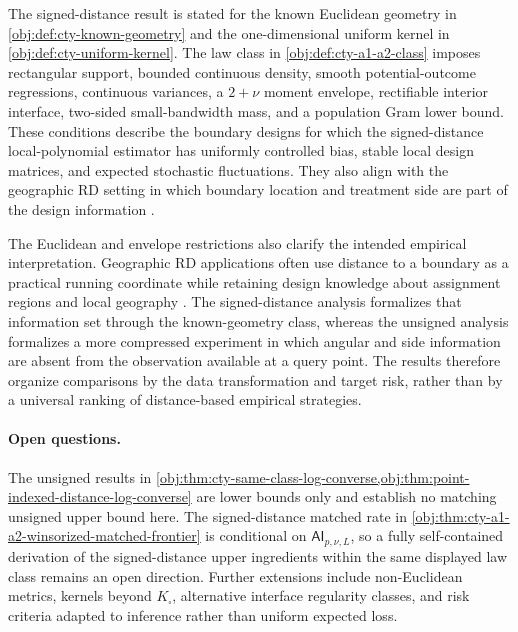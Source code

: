 The signed-distance result is stated for the known Euclidean geometry in \cref{obj:def:cty-known-geometry} and the one-dimensional uniform kernel in \cref{obj:def:cty-uniform-kernel}. The law class in \cref{obj:def:cty-a1-a2-class} imposes rectangular support, bounded continuous density, smooth potential-outcome regressions, continuous variances, a \(2+\nu\) moment envelope, rectifiable interior interface, two-sided small-bandwidth mass, and a population Gram lower bound. These conditions describe the boundary designs for which the signed-distance local-polynomial estimator has uniformly controlled bias, stable local design matrices, and expected stochastic fluctuations. They also align with the geographic RD setting in which boundary location and treatment side are part of the design information \citep{Keele2015a,Keele2015b,Keele2016,Kendall2026}.

The Euclidean and envelope restrictions also clarify the intended empirical interpretation. Geographic RD applications often use distance to a boundary as a practical running coordinate while retaining design knowledge about assignment regions and local geography \citep{Papay2011,Reardon2012,Wong2013,Choi2018,Diaz2023,Sawada2024,Merlano2025}. The signed-distance analysis formalizes that information set through the known-geometry class, whereas the unsigned analysis formalizes a more compressed experiment in which angular and side information are absent from the observation available at a query point. The results therefore organize comparisons by the data transformation and target risk, rather than by a universal ranking of distance-based empirical strategies.

\paragraph{Open questions.}
The unsigned results in \cref{obj:thm:cty-same-class-log-converse,obj:thm:point-indexed-distance-log-converse} are lower bounds only and establish no matching unsigned upper bound here. The signed-distance matched rate in \cref{obj:thm:cty-a1-a2-winsorized-matched-frontier} is conditional on \(\mathsf{AI}_{p,\nu,L}\), so a fully self-contained derivation of the signed-distance upper ingredients within the same displayed law class remains an open direction. Further extensions include non-Euclidean metrics, kernels beyond \(K_\square\), alternative interface regularity classes, and risk criteria adapted to inference rather than uniform expected loss.
